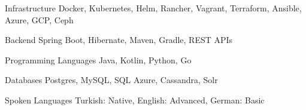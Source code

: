 
\begin{cvskills}

    \cvskill
    {Infrastructure}
    {Docker, Kubernetes, Helm, Rancher, Vagrant, Terraform, Ansible, Azure, GCP, Ceph}

    \cvskill
    {Backend}
    {Spring Boot, Hibernate, Maven, Gradle, REST APIs}

    \cvskill
    {Programming Languages}
    {Java, Kotlin, Python, Go}

    \cvskill
    {Databases}
    {Postgres, MySQL, SQL Azure, Cassandra, Solr}

    \cvskill
    {Spoken Languages}
    {Turkish: Native, English: Advanced, German: Basic}

\end{cvskills}

